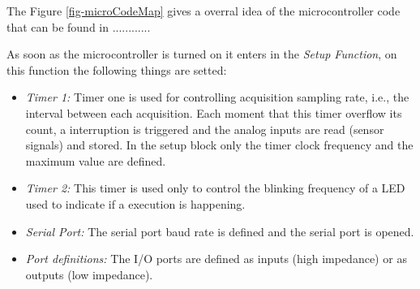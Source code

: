 	The Figure \ref{fig-microCodeMap} gives a overral idea of the microcontroller code that can be found in ............
	
	
	As soon as the microcontroller is turned on it enters in the \textit{Setup Function}, on this function the following things are setted:
	\begin{itemize}
		\item \textit{Timer 1: } Timer one is used for controlling acquisition sampling rate, i.e., the interval between each acquisition. Each moment that this timer overflow its count, a interruption is triggered and the analog inputs are read (sensor signals) and stored. In the setup block only the timer clock frequency and the maximum value are defined.
		\item \textit{Timer 2: } This timer is used only to control the blinking frequency of a LED used to indicate if a execution is happening.
		\item \textit{Serial Port: } The serial port baud rate is defined and the serial port is opened.
		\item \textit{Port definitions: } The I/O ports are defined as inputs (high impedance) or as outputs (low impedance).
	\end{itemize}
